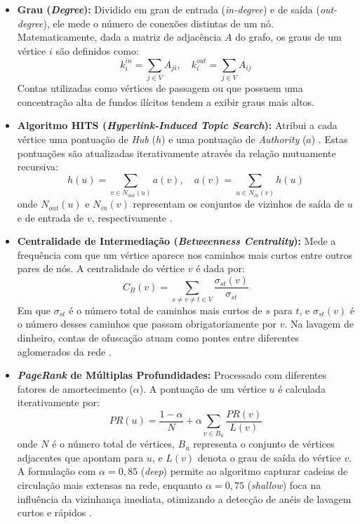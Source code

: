 \documentclass[a4paper,12pt,oneside,onecolumn,final,fleqn]{repUERJ}
\begin{document}
\begin{itemize}
\item \textbf{Grau (\textit{Degree}):} Dividido em grau de entrada (\textit{in-degree}) e de saída (\textit{out-degree}), ele mede o número de conexões distintas de um nó. Matematicamente, dada a matriz de adjacência $A$ do grafo, os graus de um vértice $i$ são definidos como:
\begin{equation}
    k_i^{in} = \sum_{j \in V} A_{ji}, \quad k_i^{out} = \sum_{j \in V} A_{ij}
\end{equation}
Contas utilizadas como vértices de passagem ou que possuem uma concentração alta de fundos ilícitos tendem a exibir graus mais altos.

\item \textbf{Algoritmo HITS (\textit{Hyperlink-Induced Topic Search}):} Atribui a cada vértice uma pontuação de \textit{Hub} ($h$) e uma pontuação de \textit{Authority} ($a$) \cite{elkilany2024detecting}. Estas pontuações são atualizadas iterativamente através da relação mutuamente recursiva:
\begin{equation}
    h(u) = \sum_{v \in N_{out}(u)} a(v), \quad a(v) = \sum_{u \in N_{in}(v)} h(u)
\end{equation}
onde $N_{out}(u)$ e $N_{in}(v)$ representam os conjuntos de vizinhos de saída de $u$ e de entrada de $v$, respectivamente \cite{kleinberg1999authoritative}.

\item \textbf{Centralidade de Intermediação (\textit{Betweenness Centrality}):} Mede a frequência com que um vértice aparece nos caminhos mais curtos entre outros pares de nós. A centralidade do vértice $v$ é dada por:
\begin{equation}
    C_B(v) = \sum_{s \neq v \neq t \in V} \frac{\sigma_{st}(v)}{\sigma_{st}}
\end{equation}
Em que $\sigma_{st}$ é o número total de caminhos mais curtos de $s$ para $t$, e $\sigma_{st}(v)$ é o número desses caminhos que passam obrigatoriamente por $v$. Na lavagem de dinheiro, contas de ofuscação atuam como pontes entre diferentes aglomerados da rede \cite{freeman1977set}.

\item \textbf{\textit{PageRank} de Múltiplas Profundidades:} Processado com diferentes fatores de amortecimento ($\alpha$). A pontuação de um vértice $u$ é calculada iterativamente por:
\begin{equation}
    PR(u) = \frac{1-\alpha}{N} + \alpha \sum_{v \in B_u} \frac{PR(v)}{L(v)}
\end{equation}
onde $N$ é o número total de vértices, $B_u$ representa o conjunto de vértices adjacentes que apontam para $u$, e $L(v)$ denota o grau de saída do vértice $v$. A formulação com $\alpha=0{,}85$ (\textit{deep}) permite ao algoritmo capturar cadeias de circulação mais extensas na rede, enquanto $\alpha=0{,}75$ (\textit{shallow}) foca na influência da vizinhança imediata, otimizando a detecção de anéis de lavagem curtos e rápidos \cite{page1999pagerank}.


\end{itemize}
\end{document}
